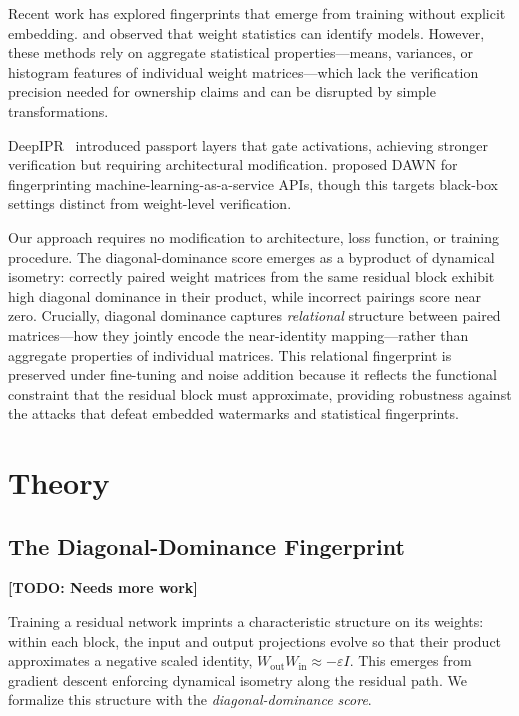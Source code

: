\documentclass[wcp]{jmlr}
\begin{document}
Recent work has explored fingerprints that emerge from training without explicit embedding. \citet{zheng2022fingerprinting} and \citet{zhao2020shaping} observed that weight statistics can identify models. However, these methods rely on aggregate statistical properties---means, variances, or histogram features of individual weight matrices---which lack the verification precision needed for ownership claims and can be disrupted by simple transformations.

DeepIPR~\citep{fan2019rethinking} introduced passport layers that gate activations, achieving stronger verification but requiring architectural modification. \citet{szyller2021dawn} proposed DAWN for fingerprinting machine-learning-as-a-service APIs, though this targets black-box settings distinct from weight-level verification.

Our approach requires no modification to architecture, loss function, or training procedure. The diagonal-dominance score emerges as a byproduct of dynamical isometry: correctly paired weight matrices from the same residual block exhibit high diagonal dominance in their product, while incorrect pairings score near zero. Crucially, diagonal dominance captures \emph{relational} structure between paired matrices---how they jointly encode the near-identity mapping---rather than aggregate properties of individual matrices. This relational fingerprint is preserved under fine-tuning and noise addition because it reflects the functional constraint that the residual block must approximate, providing robustness against the attacks that defeat embedded watermarks and statistical fingerprints.

\section{Theory}\label{sec:theory}

\subsection{The Diagonal-Dominance Fingerprint}\label{sec:dd-score}

{\color{red}\textbf{[TODO: Needs more work]}}

Training a residual network imprints a characteristic structure on its weights: within each block, the input and output projections evolve so that their product approximates a negative scaled identity, $W_{\mathrm{out}} W_{\mathrm{in}} \approx -\varepsilon I$. This emerges from gradient descent enforcing dynamical isometry along the residual path. We formalize this structure with the \emph{diagonal-dominance score}.
\end{document}
